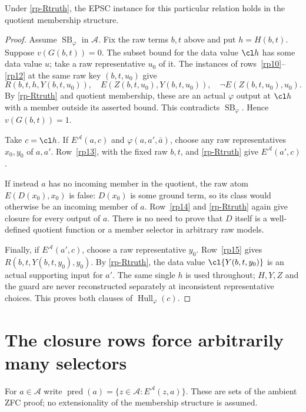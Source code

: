 \begin{lemma}\label{rp-transfer}
Under \eqref{rp-Rtruth}, the EPSC instance for this particular relation
holds in the quotient membership structure.
\end{lemma}
\begin{proof}
Assume $\operatorname{SB}_\varphi$ in $\mathcal A$. Fix the raw terms
$b,t$ above and put $h=H(b,t)$. Suppose $v(G(b,t))=0$. The subset
bound for the data value $\cl h$ has some data value $u$; take a raw
representative $u_0$ of it. The instances of rows~\ref{rp10}--\ref{rp12}
at the same raw key $(b,t,u_0)$ give
\[
 R(b,t,h,Y(b,t,u_0)),\quad
 E(Z(b,t,u_0),Y(b,t,u_0)),\quad
 \neg E(Z(b,t,u_0),u_0).
\]
By \eqref{rp-Rtruth} and quotient membership, these are an actual
$\varphi$ output at $\cl h$ with a member outside its asserted bound.
This contradicts $\operatorname{SB}_\varphi$. Hence $v(G(b,t))=1$.

Take $c=\cl h$. If $E^{\mathcal A}(a,c)$ and
$\varphi(a,a',\bar a)$, choose any raw representatives $x_0,y_0$ of
$a,a'$. Row~\ref{rp13}, with the fixed raw $b,t$, and
\eqref{rp-Rtruth} give $E^{\mathcal A}(a',c)$.

If instead $a$ has no incoming member in the quotient, the raw atom
$E(D(x_0),x_0)$ is false: $D(x_0)$ is some ground term, so its class
would otherwise be an incoming member of $a$. Row~\ref{rp14} and
\eqref{rp-Rtruth} again give closure for every output of $a$.
There is no need to prove that $D$ itself is a well-defined quotient
function or a member selector in arbitrary raw models.

Finally, if $E^{\mathcal A}(a',c)$, choose a raw representative
$y_0$. Row~\ref{rp15} gives
$R(b,t,Y(b,t,y_0),y_0)$. By \eqref{rp-Rtruth}, the data value
$\cl{Y(b,t,y_0)}$ is an actual supporting input for $a'$.
The same single $h$ is used throughout; $H,Y,Z$ and the guard are
never reconstructed separately at inconsistent representative choices.
This proves both clauses of $\operatorname{Hull}_\varphi(c)$.
\end{proof}

\section{The closure rows force arbitrarily many selectors}\label{rp-infinity}

For $a\in\mathcal A$ write
$\operatorname{pred}(a)=\{z\in\mathcal A:E^{\mathcal A}(z,a)\}$.
These are sets of the ambient ZFC proof; no extensionality of the
membership structure is assumed.

